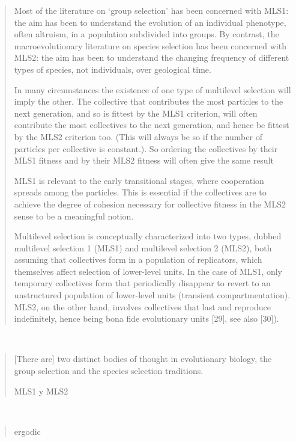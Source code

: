 \documentclass[a4paper,10pt]{article}
\begin{document}
\begin{quotation}
    Most of the literature on ‘group selection’ has been concerned with MLS1: the aim has been to understand the evolution of an individual phenotype, often altruism, in a population subdivided into groups.
    By contrast, the macroevolutionary literature on species selection has been concerned with MLS2: the aim has been to understand the changing frequency of different types of species, not individuals, over geological time.
    
    In many circumstances the existence of one type of multilevel selection will imply the other.
    The collective that contributes the most particles to the next generation, and so is fittest by the MLS1 criterion, will often contribute the most collectives to the next generation, and hence be fittest by the MLS2 criterion too.
    (This will always be so if the number of particles per collective is constant.).
    So ordering the collectives by their MLS1 fitness and by their MLS2 fitness will often give the same result
    
    MLS1 is relevant to the early transitional stages, where cooperation spreads among the particles.
    This is essential if the collectives are to achieve the degree of cohesion necessary for collective fitness in the MLS2 sense to be a meaningful notion.
    
    Multilevel selection is conceptually characterized into two types, dubbed multilevel selection 1 (MLS1) and multilevel selection 2 (MLS2), both assuming that collectives form in a population of replicators, which themselves affect selection of lower-level units.
    In the case of MLS1, only temporary collectives form that periodically disappear to revert to an unstructured population of lower-level units (transient compartmentation).
    MLS2, on the other hand, involves collectives that last and reproduce indefinitely, hence being bona fide evolutionary units [29], see also [30]).
    
\end{quotation}

\\

\begin{quotation} \cite{damuth1988-multilevelSelection}
    [There are] two distinct bodies of thought in evolutionary biology, the group selection and the species selection traditions.

MLS1 y MLS2
\end{quotation}

 \\
 
\begin{quotation} \cite{jaynes1978-maximumEntropy}
ergodic
\end{quotation}





{\footnotesize


}
\end{document}
